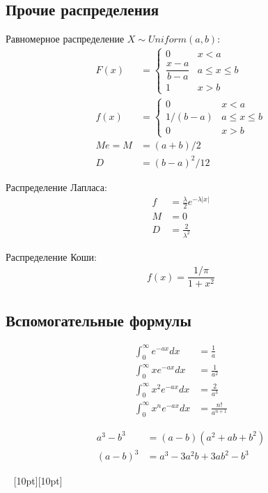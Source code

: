 \documentclass[a4paper,12pt]{article}
\numberwithin{figure}{section}
\theoremstyle{definition}
\let\leqs\leqslant
\def\vignette{\vspace{48pt} \noindent \hrulefill~
	          \raisebox{-8pt}[10pt][10pt]{\Huge\ding{102}}
	          ~\hrulefill}
\begin{document}
\subsection{Прочие распределения}

Равномерное распределение $X \sim Uniform(a,b)$:
\begin{align*}
	   F(x) &=
	   		\begin{cases}
	   			0	& x<a \\
		   		\dfrac{x-a}{b-a}	& a \leqs x \leqs b \\
		   		1	& x>b
			\end{cases}
	\\ f(x) &= \begin{cases}
				0		& x<a \\
				1/(b-a)	& a \leqs x \leqs b \\
				0		& x>b
			\end{cases}
	\\ Me = M &= (a+b)/2
	\\ D &= (b-a)^2/12
\end{align*}


Распределение Лапласа:
\begin{align*}
	   f &= \frac{\lambda}2 e^{-\lambda|x|}
	\\ M &= 0
	\\ D &= \frac{2}{\lambda^2}
\end{align*}


Распределение Коши:
\begin{align*}
	   f(x)=\dfrac{1/\pi}{1+x^2}
\end{align*}


\subsection{Вспомогательные формулы}

\begin{align*}
	   \int_0^\infty     e^{-ax}dx &= \frac{1}{a}
	\\ \int_0^\infty x   e^{-ax}dx &= \frac{1}{a^2}
	\\ \int_0^\infty x^2 e^{-ax}dx &= \frac{2}{a^3}
	\\ \int_0^\infty x^n e^{-ax}dx &= \frac{n!}{a^{n+1}}
\end{align*}

\begin{align*}
	   a^3-b^3 &= (a-b)(a^2+ab+b^2)
	\\ (a-b)^3 &= a^3-3a^2b+3ab^2-b^3
\end{align*}

\vignette
\end{document}
